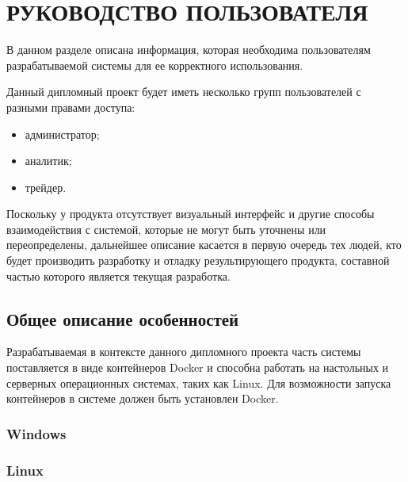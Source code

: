 \section{РУКОВОДСТВО ПОЛЬЗОВАТЕЛЯ}
\label{sec:manual}


В данном разделе описана информация, которая необходима пользователям разрабатываемой системы для ее корректного использования.

Данный дипломный проект будет иметь несколько групп пользователей с разными правами доступа:
\begin{itemize}
    \item администратор;
    \item аналитик;
    \item трейдер.
\end{itemize}

Поскольку у продукта отсутствует визуальный интерфейс и другие способы
взаимодействия с системой, которые не могут быть уточнены или переопределены,
дальнейшее описание касается в первую очередь тех людей, кто будет
производить разработку и отладку результирующего продукта, составной частью которого
является текущая разработка.

\subsection{Общее описание особенностей}

Разрабатываемая в контексте данного дипломного проекта часть системы поставляется в виде контейнеров Docker и способна работать
на настольных и серверных операционных системах, таких как Linux.
Для возможности запуска контейнеров в системе должен быть установлен Docker.

\subsubsection{Windows}

\subsubsection{Linux}

